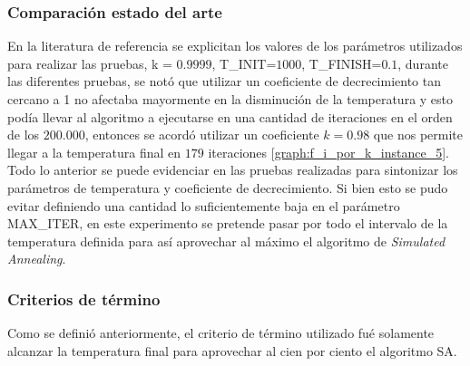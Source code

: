 \subsubsection{Comparación estado del arte}

En la literatura de referencia \cite{sonuc-2017} se explicitan los valores de los parámetros utilizados para realizar las pruebas, k = $0.9999$, T\_INIT=$1000$, T\_FINISH=$0.1$, durante las diferentes pruebas, se notó que utilizar un coeficiente de decrecimiento tan cercano a 1 no afectaba mayormente en la disminución de la temperatura y esto podía llevar al algoritmo a ejecutarse en una cantidad de iteraciones en el orden de los $200.000$, entonces se acordó utilizar un coeficiente $k=0.98$ que nos permite llegar a la temperatura final en $179$ iteraciones \ref{graph:f_i_por_k_instance_5}. Todo lo anterior se puede evidenciar en las pruebas realizadas para sintonizar los parámetros de temperatura y coeficiente de decrecimiento. Si bien esto se pudo evitar definiendo una cantidad lo suficientemente baja en el parámetro MAX\_ITER, en este experimento se pretende pasar por todo el intervalo de la temperatura definida para así aprovechar al máximo el algoritmo de \textit{Simulated Annealing}.

\subsubsection{Criterios de término}

Como se definió anteriormente, el criterio de término utilizado fué solamente alcanzar la temperatura final para aprovechar al cien por ciento el algoritmo SA.